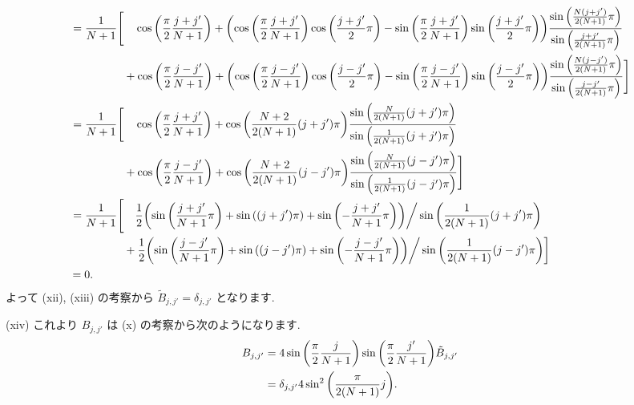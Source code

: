 \documentclass[a4paper,dvipdfmx]{jsarticle}
\theoremstyle{definition}
\begin{document}
\begin{align}
                   & \ \begin{aligned}
                         = \frac{1}{N+1}\Bigg[ & \quad\cos\qty(\frac{\pi}{2}\frac{j + j'}{N+1}) + \qty(\cos\qty(\frac{\pi}{2}\frac{j + j'}{N+1})\cos\qty(\frac{j+j'}{2}\pi) - \sin\qty(\frac{\pi}{2}\frac{j + j'}{N+1})\sin\qty(\frac{j+j'}{2}\pi))\frac{\sin\qty(\frac{N(j+j')}{2(N+1)}\pi)}{\sin\qty(\frac{j+j'}{2(N+1)}\pi)}    \\
                                               & + \cos\qty(\frac{\pi}{2}\frac{j - j'}{N+1}) + \qty(\cos\qty(\frac{\pi}{2}\frac{j - j'}{N+1})\cos\qty(\frac{j-j'}{2}\pi) - \sin\qty(\frac{\pi}{2}\frac{j - j'}{N+1})\sin\qty(\frac{j-j'}{2}\pi))\frac{\sin\qty(\frac{N(j-j')}{2(N+1)}\pi)}{\sin\qty(\frac{j-j'}{2(N+1)}\pi)}\Bigg]
                       \end{aligned}                                                                             \\
                   & \ \begin{aligned}
                         = \frac{1}{N+1}\Bigg[ & \quad\cos\qty(\frac{\pi}{2}\frac{j + j'}{N+1}) + \cos\qty(\frac{N+2}{2(N+1)}(j + j')\pi)\frac{\sin\qty(\frac{N}{2(N+1)}(j+j')\pi)}{\sin\qty(\frac{1}{2(N+1)}(j+j')\pi)}    \\
                                               & + \cos\qty(\frac{\pi}{2}\frac{j - j'}{N+1}) + \cos\qty(\frac{N+2}{2(N+1)}(j - j')\pi)\frac{\sin\qty(\frac{N}{2(N+1)}(j-j')\pi)}{\sin\qty(\frac{1}{2(N+1)}(j-j')\pi)}\Bigg]
                       \end{aligned}                                                                         \\
                   & \ \begin{aligned}
                         = \frac{1}{N+1}\Bigg[ & \quad\frac{1}{2}\qty(\sin\qty(\frac{j + j'}{N+1}\pi) + \sin\qty((j + j')\pi) + \sin\qty(-\frac{j+j'}{N+1}\pi))\bigg/\sin\qty(\frac{1}{2(N+1)}(j+j')\pi)    \\
                                               & + \frac{1}{2}\qty(\sin\qty(\frac{j - j'}{N+1}\pi) + \sin\qty((j - j')\pi) + \sin\qty(-\frac{j-j'}{N+1}\pi))\bigg/\sin\qty(\frac{1}{2(N+1)}(j-j')\pi)\bigg]
                       \end{aligned} \\
                   & = 0.
\end{align}
よって (xii), (xiii) の考察から $\tilde{B}_{j,j'} = \delta_{j,j'}$ となります.

(xiv) これより $B_{j,j'}$ は (x) の考察から次のようになります.
\begin{align}
  B_{j,j'} & = 4\sin\qty(\frac{\pi}{2}\frac{j}{N+1})\sin\qty(\frac{\pi}{2}\frac{j'}{N+1})\tilde{B}_{j,j'} \\
           & = \delta_{j,j'}4\sin^2\qty(\frac{\pi}{2(N+1)}j).
\end{align}
\end{document}

